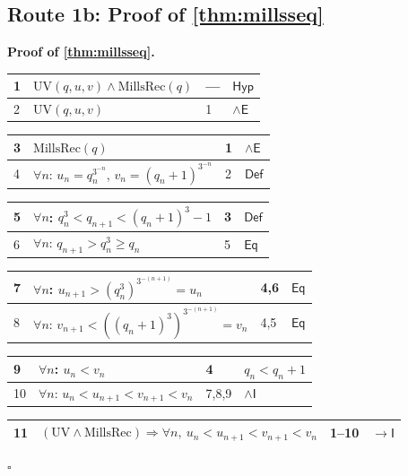 \documentclass[11pt,reqno]{amsart}
\theoremstyle{blueplain}
\renewcommand{\qedsymbol}{\textcolor{proofqed}{\ensuremath{\square}}}
\renewenvironment{proof}[1][Proof]{\par\noindent\textbf{\textcolor{proofhead}{#1.}}\par\nobreak}{\par\nobreak\hfill\qedsymbol}
\numberwithin{equation}{section}
\begin{document}
\subsection{Route 1b: Proof of \cref{thm:millsseq}}

\begin{proof}[\textbf{Proof of \cref{thm:millsseq}}]
	\label{proof:millsseq}
	{\scriptsize
		\begin{tabular}{|m{0.7cm}|m{12cm}|m{1.4cm}|m{2.5cm}|}
			\hline
			1 & $\mathrm{UV}(q,u,v)\wedge\mathrm{MillsRec}(q)$ & --- & $\mathsf{Hyp}$ \\ \hline
			2 & $\mathrm{UV}(q,u,v)$ & 1 & $\wedge\mathsf{E}$ \\
		\end{tabular}%
		\noindent \newline
		\noindent
		\begin{tabular}{|m{0.7cm}|m{12cm}|m{1.4cm}|m{2.5cm}|}
			\hline
			3 & $\mathrm{MillsRec}(q)$ & 1 & $\wedge\mathsf{E}$ \\ \hline
			4 & $\forall n$: $u_n=q_n^{3^{-n}}$, $v_n=(q_n+1)^{3^{-n}}$ & 2 & $\mathsf{Def}$ \\
		\end{tabular}%
		\noindent \newline
		\noindent
		\begin{tabular}{|m{0.7cm}|m{12cm}|m{1.4cm}|m{2.5cm}|}
			\hline
			5 & $\forall n$: $q_n^{3}<q_{n+1}<(q_n+1)^{3}-1$ & 3 & $\mathsf{Def}$ \\ \hline
			6 & $\forall n$: $q_{n+1}>q_n^{3}\ge q_n$ & 5 & $\mathsf{Eq}$ \\
		\end{tabular}%
		\noindent \newline
		\noindent
		\begin{tabular}{|m{0.7cm}|m{12cm}|m{1.4cm}|m{2.5cm}|}
			\hline
			7 & $\forall n$: $u_{n+1}>(q_n^{3})^{3^{-(n+1)}}=u_n$ & 4,6 & $\mathsf{Eq}$ \\ \hline
			8 & $\forall n$: $v_{n+1}<((q_n+1)^{3})^{3^{-(n+1)}}=v_n$ & 4,5 & $\mathsf{Eq}$ \\
		\end{tabular}%
		\noindent \newline
		\noindent
		\begin{tabular}{|m{0.7cm}|m{12cm}|m{1.4cm}|m{2.5cm}|}
			\hline
			9 & $\forall n$: $u_n<v_n$ & 4 & $q_n<q_n+1$ \\ \hline
			10 & $\forall n$: $u_n<u_{n+1}<v_{n+1}<v_n$ & 7,8,9 & $\wedge\mathsf{I}$ \\
		\end{tabular}%
		\noindent \newline
		\noindent
		\begin{tabular}{|m{0.7cm}|m{12cm}|m{1.4cm}|m{2.5cm}|}
			\hline
			11 & $(\mathrm{UV}\wedge\mathrm{MillsRec})\Rightarrow\forall n,\ u_n<u_{n+1}<v_{n+1}<v_n$ & 1--10 & $\rightarrow\mathsf{I}$ \\ \hline
		\end{tabular}%
	}
\end{proof}
\end{document}
